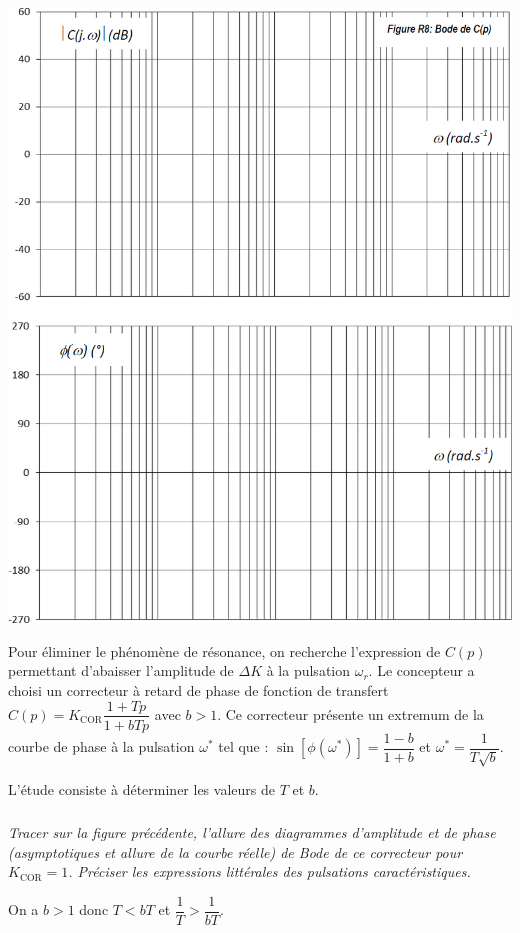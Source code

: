 \documentclass[10pt,fleqn]{article} %
\begin{document}
\begin{multicols}{2}
\ifprof
\else
\begin{center}
\includegraphics[width=\linewidth]{images/fig_08}
\end{center}
\fi

 \ifprof
 \else
Pour éliminer le phénomène de résonance, on recherche l’expression de $C(p)$ permettant d’abaisser
l’amplitude de $\Delta K$ à la pulsation $\omega_r$. Le concepteur a choisi un correcteur à retard de phase de fonction de
transfert $C(p)=K_{\text{COR}} \dfrac{1+Tp}{1+bTp}$ avec $b>1$. Ce correcteur présente un extremum de la courbe de phase à la pulsation $\omega^{*}$ tel que : $\sin\left[\phi\left(\omega^{*}\right)\right]=\dfrac{1-b}{1+b}$ et $\omega^{*}=\dfrac{1}{T\sqrt{b}}$.


L’étude consiste à déterminer les valeurs de $T$ et $b$.

\fi

\subparagraph{}\textit{Tracer sur la figure précédente, l'allure des diagrammes d’amplitude et de phase (asymptotiques et allure
de la courbe réelle) de Bode de ce correcteur pour $K_{\text{COR}} =1$. Préciser les expressions littérales des
pulsations caractéristiques.}
\ifprof
\begin{corrige}
On a  $b>1$ donc $T<bT$ et $\dfrac{1}{T}>\dfrac{1}{bT}$. 


\end{corrige}
\end{multicols}
\end{document}
